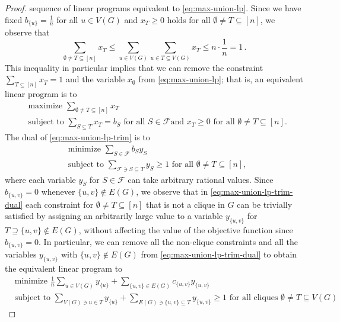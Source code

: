 \documentclass[10pt,a4paper]{amsart}
\begin{document}
\begin{proof}
sequence of linear programs equivalent to \eqref{eq:max-union-lp}. 
Since we have 
fixed $b_{\{u\}}=\frac{1}{n}$ for all $u\in V(G)$ and $x_T\geq 0$ holds 
for all $\emptyset\neq T\subseteq[n]$, we observe that 
\[
\sum_{\emptyset\neq T\subseteq[n]}x_T\leq \sum_{u\in V(G)}\sum_{u\in T\subseteq V(G)}x_T\leq n\cdot\frac{1}{n}=1\,. 
\]
This inequality in particular implies that we can remove the constraint
$\sum_{T\subseteq[n]}x_T=1$ and the variable $x_\emptyset$ 
from \eqref{eq:max-union-lp}; that is, an equivalent linear program is to
\begin{equation}
\label{eq:max-union-lp-trim}
\begin{split}
&\text{maximize $\sum_{\emptyset\neq T\subseteq[n]}x_T$}\\
&\text{subject to $\sum_{S\subseteq T}x_T=b_S$ for all $S\in\mathcal{F}$
and $x_T\geq 0$ for all $\emptyset\neq T\subseteq[n]$}.
\end{split}
\end{equation}
The dual of \eqref{eq:max-union-lp-trim} is to
\begin{equation}
\label{eq:max-union-lp-trim-dual}
\begin{split}
&\text{minimize $\sum_{S\in\mathcal{F}}b_Sy_S$}\\
&\text{subject to $\sum_{\mathcal{F}\ni S\subseteq T}y_S\geq 1$ for all $\emptyset\neq T\subseteq[n]$},
\end{split}
\end{equation}
where each variable $y_S$ for $S\in\mathcal{F}$ can take arbitrary rational
values. Since $b_{\{u,v\}}=0$ whenever $\{u,v\}\notin E(G)$, we observe
that in \eqref{eq:max-union-lp-trim-dual} each constraint for 
$\emptyset\neq T\subseteq[n]$ that is not a clique in $G$ can be 
trivially satisfied by assigning an arbitrarily large value to a 
variable $y_{\{u,v\}}$ for $T\supseteq\{u,v\}\notin E(G)$, 
without affecting the value of the objective function since $b_{\{u,v\}}=0$.
In particular, we can remove all the non-clique constraints and all the
variables $y_{\{u,v\}}$ with $\{u,v\}\notin E(G)$ 
from \eqref{eq:max-union-lp-trim-dual} to obtain the equivalent linear 
program to 
\begin{equation}
\label{eq:max-union-lp-trim-dual-clique}
\begin{split}
&\text{minimize $\frac{1}{n}\sum_{u\in V(G)}y_{\{u\}}+\sum_{\{u,v\}\in E(G)}c_{\{u,v\}}y_{\{u,v\}}$}\\
&\text{subject to $\sum_{V(G)\ni u\in T}y_{\{u\}}+\sum_{E(G)\ni \{u,v\}\subseteq T}y_{\{u,v\}}\geq 1$ for all cliques $\emptyset\neq T\subseteq V(G)$}.

\end{split}
\end{equation}
\end{proof}
\end{document}
